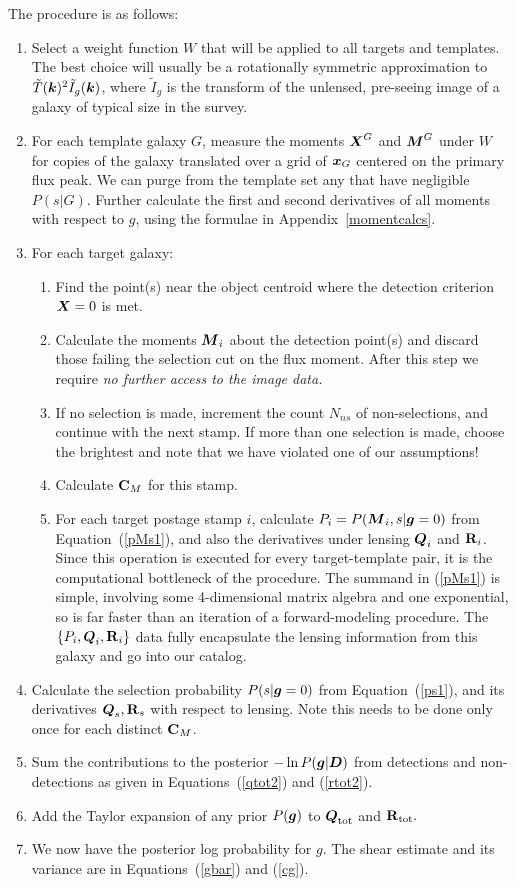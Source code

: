 \documentclass[11pt,preprint,flushrt]{aastex}
\def\eqq#1{Equation~(\ref{#1})}
\newcommand{\vecD}{\mbox{\boldmath $D$}}
\newcommand{\vecX}{\mbox{\boldmath $X$}}
\newcommand{\vecg}{\mbox{\boldmath $g$}}
\newcommand{\vecM}{\mbox{\boldmath $M$}}
\newcommand{\vecQ}{\mbox{\boldmath $Q$}}
\newcommand{\vecx}{\mbox{\boldmath $x$}}
\newcommand{\veck}{\mbox{\boldmath $k$}}
\newcommand{\matR}{\mbox{$\bf R$}}
\newcommand{\matC}{\mbox{$\bf C$}}
\begin{document}
The procedure is as follows:
\begin{enumerate}
\item Select a weight function $W$ that will be applied to all targets
  and templates. The best choice will usually be a rotationally
  symmetric approximation to $\tilde T(\veck)^2 \tilde I_g(\veck)$, where
  $\tilde I_g$ is the transform of the unlensed, pre-seeing image of a
  galaxy of typical size in the survey.
\item For each template galaxy $G$, measure the moments $\vecX^G$ and
  $\vecM^G$ under $W$ for copies of the galaxy translated over a grid
  of $\vecx_G$ centered on the primary flux peak.  
  We can purge from the template set any that have negligible
  $P(s|G).$  Further calculate the first and second derivatives of all
  moments with respect to \vecg, using the formulae in Appendix~\ref{momentcalcs}.
\item For each target galaxy:
\begin{enumerate}
\item Find the point(s) near the object centroid where the detection
  criterion $\vecX=0$ is met.
\item Calculate the moments $\vecM_i$ about the detection point(s) and
  discard those failing the selection cut on the flux moment.  After
  this step we require \emph{no further access to the image data.}
\item If no selection is made, increment the count $N_{ns}$ of
  non-selections, and continue with the next stamp.  If more than one
  selection is made, choose the brightest and note that we have
  violated one of our assumptions!
\item Calculate $\matC_M$ for this stamp.
\item For each target postage stamp $i$, calculate $P_i =
  P(\vecM_i,s|\vecg=0)$ from \eqq{pMs1}, and also the derivatives under
  lensing $\vecQ_i$ and $\matR_i$.  Since this operation
  is executed for every target-template pair, it is the computational
  bottleneck of the procedure.  The summand in (\ref{pMs1})
  is simple, involving some 4-dimensional matrix
  algebra and one exponential, so is far faster than an
  iteration of a forward-modeling procedure.  The $\{P_i,\vecQ_i,\matR_i\}$ data
  fully encapsulate the lensing information from this galaxy and go
  into our catalog.
\end{enumerate}
\item Calculate the selection probability $P(s|\vecg=0)$ from \eqq{ps1},
  and its derivatives $\vecQ_s,\matR_s$ with respect to lensing.  Note
  this needs to be done only once for each distinct $\matC_M$.
\item Sum the contributions to the posterior $-\ln P(\vecg | \vecD)$ from detections and
  non-detections as given in
  Equations~(\ref{qtot2}) and (\ref{rtot2}).
\label{nsstep}
\item Add the Taylor expansion of any prior $P(\vecg)$ to $\vecQ_{\rm tot}$ and $\matR_{\rm tot}.$
\item We now have the posterior log probability for \vecg.  The shear
  estimate and its variance are in Equations~(\ref{gbar}) and
  (\ref{cg}).
\end{enumerate}
\end{document}
